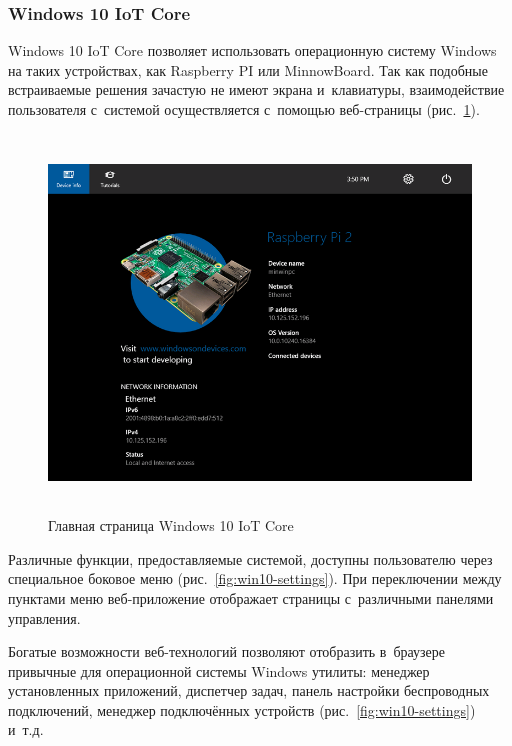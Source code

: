 \subsubsection{Windows 10 IoT Core}
\label{subsec:win10-review}

Windows 10 IoT Core позволяет использовать операционную систему Windows на таких устройствах, как Raspberry PI или MinnowBoard. Так как подобные встраиваемые решения зачастую не имеют экрана и~клавиатуры, взаимодействие пользователя с~системой осуществляется с~помощью веб-страницы (рис.~\ref{fig:win10-device-info}).

\begin{figure}[h!]
  \centering
  \includegraphics[height=10cm]{img/win10-device-info}
  \vspace*{12pt}
  \caption{Главная страница Windows 10 IoT Core}\label{fig:win10-device-info}
\end{figure}

Различные функции, предоставляемые системой, доступны пользователю через специальное боковое меню (рис.~\ref{fig:win10-settings}). При переключении между пунктами меню веб-приложение отображает страницы с~различными панелями управления. \par

Богатые возможности веб-технологий позволяют отобразить в~браузере привычные для операционной системы Windows утилиты: менеджер установленных приложений, диспетчер задач, панель настройки беспроводных подключений, менеджер подключённых устройств (рис.~\ref{fig:win10-settings}) и~т.д.


